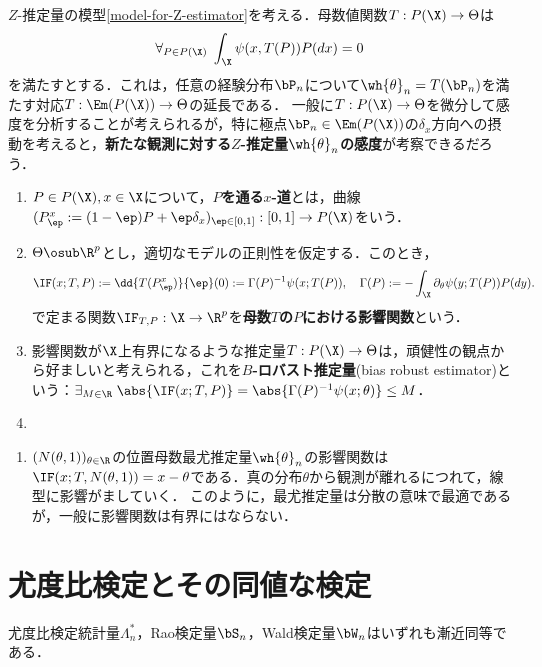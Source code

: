 \documentclass[uplatex,dvipdfmx]{jsreport}
\begin{document}
\begin{model}[推定量に対する感度分析]
    $Z$-推定量の模型\ref{model-for-Z-estimator}を考える．母数値関数$T:P(\X)\to\Theta$は
    \[\forall_{P\in P(\X)}\;\int_\X\psi(x,T(P))P(dx)=0\]
    を満たすとする．これは，任意の経験分布$\bP_n$について$\wh{\theta}_n=T(\bP_n)$を満たす対応$T:\Em(P(\X))\to\Theta$の延長である．
    一般に$T:P(\X)\to\Theta$を微分して感度を分析することが考えられるが，特に極点$\bP_n\in\Em(P(\X))$の$\delta_x$方向への摂動を考えると，\textbf{新たな観測に対する$Z$-推定量$\wh{\theta}_n$の感度}が考察できるだろう．
    \begin{enumerate}
        \item $P\in P(\X),x\in\X$について，\textbf{$P$を通る$x$-道}とは，曲線$(P^x_\ep:=(1-\ep)P+\ep\delta_x)_{\ep\in[0,1]}:[0,1]\to P(\X)$をいう．
        \item $\Theta\osub\R^p$とし，適切なモデルの正則性を仮定する．このとき，
        \[\IF(x;T,P):=\dd{T(P^x_\ep)}{\ep}(0):=\Gamma(P)^{-1}\psi(x;T(P)),\quad\Gamma(P):=-\int_\X\partial_\theta\psi(y;T(P))P(dy).\]
        で定まる関数$\IF_{T,P}:\X\to\R^p$を\textbf{母数$T$の$P$における影響関数}という．
        \item 影響関数が$\X$上有界になるような推定量$T:P(\X)\to\Theta$は，頑健性の観点から好ましいと考えられる，これを\textbf{$B$-ロバスト推定量}(bias robust estimator)という：$\exists_{M\in\R}\;\abs{\IF(x;T,P)}=\abs{\Gamma(P)^{-1}\psi(x;\theta)}\le M$．
        \item 
    \end{enumerate}
\end{model}

\begin{example}\mbox{}
    \begin{enumerate}
        \item $(N(\theta,1))_{\theta\in\R}$の位置母数最尤推定量$\wh{\theta}_n$の影響関数は$\IF(x;T,N(\theta,1))=x-\theta$である．真の分布$\theta$から観測が離れるにつれて，線型に影響がましていく．
        このように，最尤推定量は分散の意味で最適であるが，一般に影響関数は有界にはならない．
    \end{enumerate}
\end{example}

\section{尤度比検定とその同値な検定}

\begin{tcolorbox}[colframe=ForestGreen, colback=ForestGreen!10!white,breakable,colbacktitle=ForestGreen!40!white,coltitle=black,fonttitle=\bfseries\sffamily,
title=]
    尤度比検定統計量$\Lambda^*_n$，Rao検定量$\bS_n$，Wald検定量$\bW_n$はいずれも漸近同等である．
\end{tcolorbox}
\end{document}
